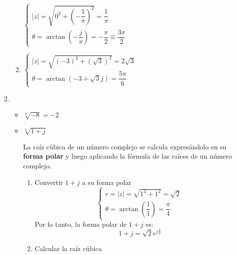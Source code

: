 \begin{enumerate}[label=\color{red}\textbf{\arabic*)}]
\begin{enumerate}[label=\color{red}\textbf{\textbf{\textbf{\alph*)}}}]
                $\begin{cases}
                    |z|=\sqrt{0^2+\left( -\dfrac{1}{\pi} \right)^2 }=\dfrac{1}{\pi}\\
                    \theta=\arctan\left( -\dfrac{j}{\pi} \right) =-\dfrac{\pi}{2}\equiv \dfrac{3\pi}{2}
                \end{cases}$
            \item {} 

                $\begin{cases}
                    |z|=\sqrt{(-3)^2+(\sqrt{3})^2}=2\sqrt{3}\\
                    \theta=\arctan(-3+\sqrt{3} j)=\dfrac{5\pi}{6}
                \end{cases}$
        \end{enumerate}
    \item {} 

        \begin{itemize}[label=\textbullet]
            \item $\sqrt[3]{-8}=-2 $ 
            \item $\sqrt[3]{1+j}$

                La raíz cúbica de un número complejo se calcula expresándolo en su \textbf{forma polar} y luego aplicando la fórmula de las raíces de un número complejo.
                \begin{enumerate}[label=Paso \arabic*:]
                    \item Convertir $1+j$ a su forma polar  \[
                    \begin{cases}
                        r=|z|=\sqrt{1^2+1^2}=\sqrt{2}\\
                        \theta=\arctan\left( \dfrac{1}{1} \right) =\dfrac{\pi}{4}
                    \end{cases}
                    \] 
                    Por lo tanto, la forma polar de $1+j$ es:  \[
                    1+j=\sqrt{2}e^{j\frac{\pi}{4} }  
                    \] 
                \item Calcular la raíz cúbica


\end{enumerate}
\end{itemize}
\end{enumerate}
